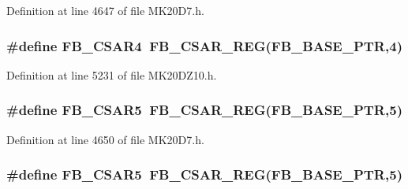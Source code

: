Definition at line 4647 of file M\+K20\+D7.\+h.

\subsubsection[{\texorpdfstring{F\+B\+\_\+\+C\+S\+A\+R4}{FB_CSAR4}}]{\setlength{\rightskip}{0pt plus 5cm}\#define F\+B\+\_\+\+C\+S\+A\+R4~{\bf F\+B\+\_\+\+C\+S\+A\+R\+\_\+\+R\+EG}({\bf F\+B\+\_\+\+B\+A\+S\+E\+\_\+\+P\+TR},4)}\hypertarget{group___f_b___register___accessor___macros_ga85235e470f6702746f44c992fe5a4490}{}\label{group___f_b___register___accessor___macros_ga85235e470f6702746f44c992fe5a4490}


Definition at line 5231 of file M\+K20\+D\+Z10.\+h.

\subsubsection[{\texorpdfstring{F\+B\+\_\+\+C\+S\+A\+R5}{FB_CSAR5}}]{\setlength{\rightskip}{0pt plus 5cm}\#define F\+B\+\_\+\+C\+S\+A\+R5~{\bf F\+B\+\_\+\+C\+S\+A\+R\+\_\+\+R\+EG}({\bf F\+B\+\_\+\+B\+A\+S\+E\+\_\+\+P\+TR},5)}\hypertarget{group___f_b___register___accessor___macros_ga7544de60ace9753e7f900e2ad700c007}{}\label{group___f_b___register___accessor___macros_ga7544de60ace9753e7f900e2ad700c007}


Definition at line 4650 of file M\+K20\+D7.\+h.

\subsubsection[{\texorpdfstring{F\+B\+\_\+\+C\+S\+A\+R5}{FB_CSAR5}}]{\setlength{\rightskip}{0pt plus 5cm}\#define F\+B\+\_\+\+C\+S\+A\+R5~{\bf F\+B\+\_\+\+C\+S\+A\+R\+\_\+\+R\+EG}({\bf F\+B\+\_\+\+B\+A\+S\+E\+\_\+\+P\+TR},5)}\hypertarget{group___f_b___register___accessor___macros_ga7544de60ace9753e7f900e2ad700c007}{}\label{group___f_b___register___accessor___macros_ga7544de60ace9753e7f900e2ad700c007}


